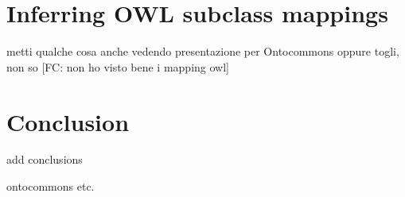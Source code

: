 \documentclass[ao]{iosart2x}
\begin{document}
\section{Inferring OWL subclass mappings}
{\color{red} metti qualche cosa anche vedendo presentazione per Ontocommons oppure togli, non so [FC: non ho visto bene i mapping owl]}

\section{Conclusion}
 add conclusions




\begin{acks}
ontocommons etc.
\end{acks}

\nocite{label} 


\end{document}
